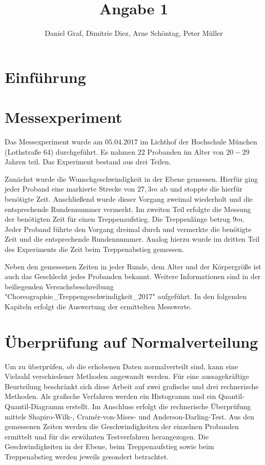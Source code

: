 
 
\title{Angabe 1}
\providecommand{\subtitle}[1]{}
\subtitle{Untertitel}
\author{Daniel Graf, Dimitrie Diez, Arne Schöntag, Peter Müller}
\date{}


\maketitle


\tableofcontents

\section{Einführung}


\section{Messexperiment}

Das Messexperiment wurde am $05.04.2017$ im Lichthof der Hochschule München (Lothstraße 64) durchgeführt. Es nahmen $22$ Probanden im Alter von $20-29$ Jahren teil. Das Experiment bestand aus drei Teilen. 

Zunächst wurde die Wunschgeschwindigkeit in der Ebene gemessen. Hierfür ging jeder Proband eine markierte Strecke von $27,3m$ ab und stoppte die hierfür benötigte Zeit. Anschließend wurde dieser Vorgang zweimal wiederholt und die entsprechende Rundennummer vermerkt. Im zweiten Teil erfolgte die Messung der benötigten Zeit für einen Treppenaufstieg. Die Treppenlänge betrug $9m$. Jeder Proband führte den Vorgang dreimal durch und vermerkte die benötigte Zeit und die entsprechende Rundennummer. Analog hierzu wurde im dritten Teil des Experiments die Zeit beim Treppenabstieg gemessen. 

Neben den gemessenen Zeiten in jeder Runde, dem Alter und der Körpergröße ist auch das Geschlecht jedes Probanden bekannt. Weitere Informationen sind in der beiliegenden Versuchsbeschreibung "Choreographie\_Treppengeschwindigkeit\_2017" aufgeführt. In den folgenden Kapiteln erfolgt die Auswertung der ermittelten Messwerte.

\section{Überprüfung auf Normalverteilung}
Um zu überprüfen, ob die erhobenen Daten normalverteilt sind, kann eine Vielzahl verschiedener Methoden angewandt werden. Für eine aussagekräftige Beurteilung beschränkt sich diese Arbeit auf zwei grafische und drei rechnerische Methoden. Als grafische Verfahren werden ein Histogramm und ein Quantil-Quantil-Diagramm erstellt. Im Anschluss erfolgt die rechnerische Überprüfung mittels Shapiro-Wilk-, Cramér-von-Mises- und Anderson-Darling-Test. Aus den gemessenen Zeiten werden die Geschwindigkeiten der einzelnen Probanden ermittelt und für die erwähnten Testverfahren herangezogen. Die Geschwindigkeiten in der Ebene, beim Treppenaufstieg sowie beim Treppenabstieg werden jeweils gesondert betrachtet.

